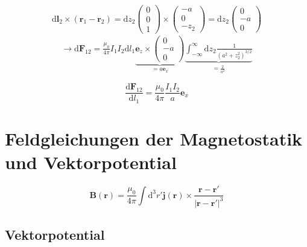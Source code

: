 \documentclass[titlepage,11pt,a4paper,ngerman]{report}
\newcommand{\tx}[1]{\textrm{#1}}
\newcommand{\ub}[1]{\underbrace{#1}}
\newcommand{\dd}{\tx{d}}
\renewcommand{\vec}[1]{\boldsymbol{#1}}
\newcommand{\frbox}[2]{\begin{tcolorbox}[colback=white,colframe=red!75!black,fonttitle=\bfseries,title=#1]#2\end{tcolorbox}}
\begin{document}
\begin{equation*}
\dd \vec{l}_2 \times (\vec{r}_1 - \vec{r}_2) = \dd z_2 \begin{pmatrix}
0 \\ 0 \\ 1
\end{pmatrix} \times \begin{pmatrix}
-a \\ 0 \\ -z_2
\end{pmatrix} = \dd z_2 \begin{pmatrix}
0 \\ -a \\ 0
\end{pmatrix}
\end{equation*}
\begin{align*}
\rightarrow \dd \vec{F}_{12} = \frac{\mu_0}{4 \pi} I_1 I_2 \dd l_1 \ub{\vec{e}_z \times \begin{pmatrix}
	0 \\ -a \\ 0
	\end{pmatrix}}_{= a \vec{e}_x} \ub{\int_{-\infty}^{\infty} \dd z_2 \frac{1}{\left(a^2 + z_2^2\right)^{3/2}}}_{= \frac{2}{a^2}}
\end{align*}
\begin{center}
	\begin{minipage}{.5\linewidth}
		\frbox{Kraft pro Länge:}{
			\begin{equation*}
			\frac{\dd \vec{F}_{12}}{\dd l_1} = \frac{\mu_0}{4 \pi} \frac{I_1 I_2}{a} \vec{e}_x
			\end{equation*}}
	\end{minipage}
\end{center}


\section{Feldgleichungen der Magnetostatik und Vektorpotential}

\begin{equation*}
\vec{B}(\vec{r}) = \frac{\mu_0}{4 \pi} \int \dd^3 r' \vec{j}(\vec{r}) \times \frac{\vec{r} - \vec{r}'}{|\vec{r} - \vec{r}'|^3}
\end{equation*}

\subsection{Vektorpotential}
\end{document}
